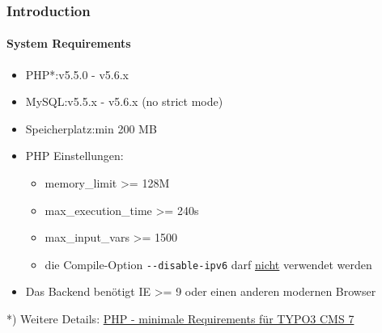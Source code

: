 %
\begin{frame}[fragile]
	\frametitle{Introduction}
	\framesubtitle{System Requirements}

	\begin{itemize}
		\item PHP*:\tabto{2.2cm}v5.5.0 - v5.6.x
		\item MySQL:\tabto{2.2cm}v5.5.x - v5.6.x (no strict mode)
		\item Speicherplatz:\tabto{2.2cm}min 200 MB
		\item PHP Einstellungen:

			\begin{itemize}
				\item memory\_limit >= 128M
				\item max\_execution\_time >= 240s
				\item max\_input\_vars >= 1500
				\item die Compile-Option \texttt{-}\texttt{-disable-ipv6} darf \underline{nicht} verwendet werden
			\end{itemize}

		\item Das Backend benötigt IE >= 9 oder einen anderen modernen Browser

	\end{itemize}

	\vspace{0.8cm}

	*) Weitere Details: \href{http://typo3.org/news/article/php-minimum-requirements-for-typo3-cms-7/}{PHP - minimale Requirements für TYPO3 CMS 7}

\end{frame}


